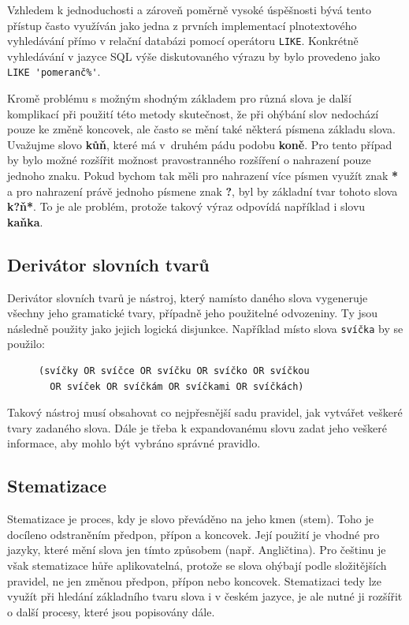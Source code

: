 \documentclass[FM,DP]{tulthesis}
\begin{document}
Vzhledem k jednoduchosti a zároveň poměrně vysoké úspěšnosti bývá tento přístup
často využíván jako jedna z prvních implementací plnotextového vyhledávání přímo
v relační databázi pomocí operátoru \verb|LIKE|. Konkrétně vyhledávání v jazyce SQL
výše diskutovaného výrazu by bylo provedeno jako \verb|LIKE 'pomeranč%'|.

Kromě problému s možným shodným základem pro různá slova je další komplikací při 
použití této metody skutečnost, že při ohýbání slov nedochází pouze ke změně koncovek, 
ale často se mění také některá písmena základu slova. Uvažujme slovo \textbf{kůň}, které
má v~druhém pádu podobu \textbf{koně}. Pro tento případ by bylo možné rozšířit možnost 
pravostranného rozšíření o nahrazení pouze jednoho znaku. Pokud bychom tak měli 
pro nahrazení více písmen využít znak \textbf{*} a pro nahrazení právě jednoho písmene 
znak \textbf{?}, byl by základní tvar tohoto slova \textbf{k?ň*}. To je ale problém, protože 
takový výraz odpovídá například i slovu \textbf{kaňka}.

\subsection{Derivátor slovních tvarů}

Derivátor slovních tvarů je nástroj, který namísto daného slova vygeneruje 
všechny jeho gramatické tvary, případně jeho použitelné odvozeniny. 
Ty jsou následně použity jako jejich logická disjunkce. Například místo 
slova \verb|svíčka| by se použilo:

\begin{figure}[thp]
\centering 
\begin{minipage}{0.7\textwidth}
\begin{verbatim}
(svíčky OR svíčce OR svíčku OR svíčko OR svíčkou 
  OR svíček OR svíčkám OR svíčkami OR svíčkách)
\end{verbatim}
\end{minipage}
\end{figure}

Takový nástroj musí obsahovat co nejpřesnější sadu pravidel, jak vytvářet
veškeré tvary zadaného slova. Dále je třeba k expandovanému slovu zadat
jeho veškeré informace, aby mohlo být vybráno správné pravidlo.

\subsection{Stematizace}

Stematizace je proces, kdy je slovo převáděno na jeho kmen (stem). Toho je docíleno
odstraněním předpon, přípon a koncovek. Její použití je vhodné pro jazyky, 
které mění slova jen tímto způsobem (např. Angličtina). Pro češtinu je však stematizace
hůře aplikovatelná, protože se slova ohýbají podle složitějších pravidel, ne jen
změnou předpon, přípon nebo koncovek. Stematizaci tedy lze využít při hledání základního
tvaru slova i v českém jazyce, je ale nutné ji rozšířit o další procesy, které jsou 
popisovány dále.
\end{document}
